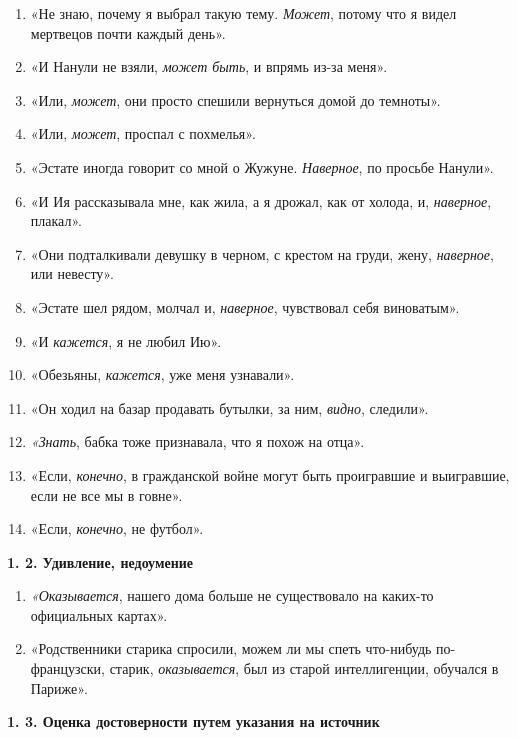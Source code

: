 \documentclass{kursa4}
\begin{document}
    \begin{enumerate}
    \item «Не знаю, почему я выбрал такую тему. \textit{Может}, потому что я
    видел мертвецов почти каждый день».
    \item «И Нанули не взяли, \textit{может быть}, и впрямь из-за меня».
    \item «Или, \textit{может}, они просто спешили вернуться домой до
    темноты».
    \item «Или, \textit{может}, проспал с похмелья».
    \item «Эстате иногда говорит со мной о Жужуне. \textit{Наверное}, по
    просьбе Нанули». 
    \item «И Ия рассказывала мне, как жила, а я дрожал, как от холода, и,
    \textit{наверное}, плакал».
    \item «Они подталкивали девушку в черном, с крестом на груди, жену,
    \textit{наверное}, или невесту». 
    \item «Эстате шел рядом, молчал и, \textit{наверное}, чувствовал себя
    виноватым».
    \item «И \textit{кажется}, я не любил Ию».
    \item «Обезьяны, \textit{кажется}, уже меня узнавали».
    \item «Он ходил на базар продавать бутылки, за ним, \textit{видно},
    следили».
    \item \textit{«Знать}, бабка тоже признавала, что я похож на отца».
    \item «Если, \textit{конечно}, в гражданской войне могут быть
    проигравшие и выигравшие, если не все мы в говне».
    \item «Если, \textit{конечно}, не футбол».
    \end{enumerate}
    \textbf{1. 2. Удивление, недоумение}

    \setcounter{saveenum}{\value{enumi}}
    \begin{enumerate}
    \setcounter{enumi}{\value{saveenum}}
    \item \textit{«Оказывается}, нашего дома больше не существовало на
    каких-то официальных картах».
    \item «Родственники старика спросили, можем ли мы спеть что-нибудь
    по-французски, старик, \textit{оказывается}, был из старой
    интеллигенции, обучался в Париже».
    \end{enumerate}
    \textbf{1. 3. Оценка достоверности путем указания на источник}
\end{document}
